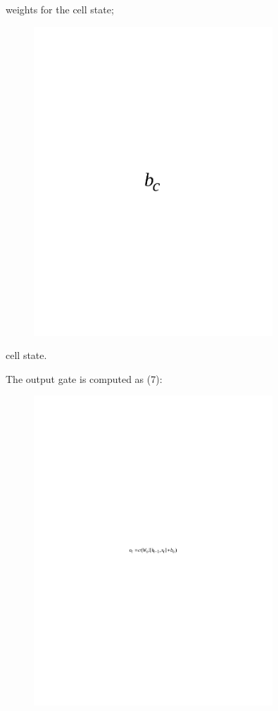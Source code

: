 weights for the cell state;
\begin{figure}[H]
	\centering
	\includegraphics[width=0.8\textwidth]{media/ict/image59}
	\caption*{}
\end{figure}

cell state.

The output gate is computed as (7):

\begin{figure}[H]
	\centering
	\includegraphics[width=0.8\textwidth]{media/ict/image60}
	\caption*{}
\end{figure}



